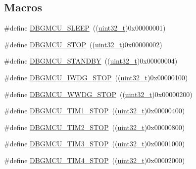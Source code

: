 \subsection*{Macros}
\begin{DoxyCompactItemize}
\item 
\#define \hyperlink{group___d_b_g_m_c_u___exported___constants_ga1c457289646b9d9814b93fbb994c9930}{D\+B\+G\+M\+C\+U\+\_\+\+S\+L\+E\+EP}~((\hyperlink{_p_e___types_8h_a33594304e786b158f3fb30289278f5af}{uint32\+\_\+t})0x00000001)
\item 
\#define \hyperlink{group___d_b_g_m_c_u___exported___constants_ga4a71bcfa6868672674b5410d2fd372f4}{D\+B\+G\+M\+C\+U\+\_\+\+S\+T\+OP}~((\hyperlink{_p_e___types_8h_a33594304e786b158f3fb30289278f5af}{uint32\+\_\+t})0x00000002)
\item 
\#define \hyperlink{group___d_b_g_m_c_u___exported___constants_ga6eb848845f9207ffdccd0590da192002}{D\+B\+G\+M\+C\+U\+\_\+\+S\+T\+A\+N\+D\+BY}~((\hyperlink{_p_e___types_8h_a33594304e786b158f3fb30289278f5af}{uint32\+\_\+t})0x00000004)
\item 
\#define \hyperlink{group___d_b_g_m_c_u___exported___constants_ga5b8b38b5589a2e26a57325553b5dfe23}{D\+B\+G\+M\+C\+U\+\_\+\+I\+W\+D\+G\+\_\+\+S\+T\+OP}~((\hyperlink{_p_e___types_8h_a33594304e786b158f3fb30289278f5af}{uint32\+\_\+t})0x00000100)
\item 
\#define \hyperlink{group___d_b_g_m_c_u___exported___constants_ga9ecfb95a943e2ad165395fff4fa12770}{D\+B\+G\+M\+C\+U\+\_\+\+W\+W\+D\+G\+\_\+\+S\+T\+OP}~((\hyperlink{_p_e___types_8h_a33594304e786b158f3fb30289278f5af}{uint32\+\_\+t})0x00000200)
\item 
\#define \hyperlink{group___d_b_g_m_c_u___exported___constants_ga017fb3101a3569426e82b066cb2f8848}{D\+B\+G\+M\+C\+U\+\_\+\+T\+I\+M1\+\_\+\+S\+T\+OP}~((\hyperlink{_p_e___types_8h_a33594304e786b158f3fb30289278f5af}{uint32\+\_\+t})0x00000400)
\item 
\#define \hyperlink{group___d_b_g_m_c_u___exported___constants_ga8ba3a77260f748793c903468a4608bd1}{D\+B\+G\+M\+C\+U\+\_\+\+T\+I\+M2\+\_\+\+S\+T\+OP}~((\hyperlink{_p_e___types_8h_a33594304e786b158f3fb30289278f5af}{uint32\+\_\+t})0x00000800)
\item 
\#define \hyperlink{group___d_b_g_m_c_u___exported___constants_ga28c01c2c30bed78e51d997007986fac9}{D\+B\+G\+M\+C\+U\+\_\+\+T\+I\+M3\+\_\+\+S\+T\+OP}~((\hyperlink{_p_e___types_8h_a33594304e786b158f3fb30289278f5af}{uint32\+\_\+t})0x00001000)
\item 
\#define \hyperlink{group___d_b_g_m_c_u___exported___constants_gac87363a4018e2b23a907cfaf836494f1}{D\+B\+G\+M\+C\+U\+\_\+\+T\+I\+M4\+\_\+\+S\+T\+OP}~((\hyperlink{_p_e___types_8h_a33594304e786b158f3fb30289278f5af}{uint32\+\_\+t})0x00002000)

\end{DoxyCompactItemize}
